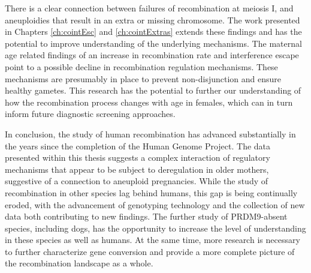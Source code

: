 There is a clear connection between failures of recombination at meiosis I, and aneuploidies that result in an extra or missing chromosome\cite{Nagaoka2012}.
The work presented in Chapters \ref{ch:cointEsc} and \ref{ch:cointExtras} extends these findings and has the potential to improve understanding of the underlying mechanisms.
The maternal age related findings of an increase in recombination rate and interference escape point to a possible decline in recombination regulation mechanisms.
These mechanisms are presumably in place to prevent non-disjunction and ensure healthy gametes.
This research has the potential to further our understanding of how the recombination process changes with age in females, which can in turn inform future diagnostic screening approaches.





In conclusion, the study of human recombination has advanced substantially in the years since the completion of the Human Genome Project.
The data presented within this thesis suggests a complex interaction of regulatory mechanisms that appear to be subject to deregulation in older mothers, suggestive of a connection to aneuploid pregnancies.
While the study of recombination in other species lag behind humans, this gap is being continually eroded, with the advancement of genotyping technology and the collection of new data both contributing to new findings.
The further study of PRDM9-absent species, including dogs, has the opportunity to increase the level of understanding in these species as well as humans. %
At the same time, more research is necessary to further characterize gene conversion and provide a more complete picture of the recombination landscape as a whole.



\clearpage
\renewcommand{\bibname}{References}

\begingroup
    \setlength{\bibsep}{10pt}
    \linespread{1}\selectfont
    
\endgroup
